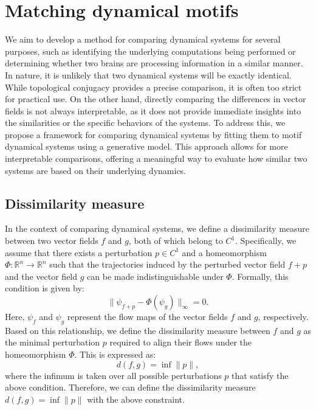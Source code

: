 \documentclass{article}
\theoremstyle{definition} \newtheorem{definition}{Definition}  \newtheorem{example}{Example}
\theoremstyle{remark} \newtheorem{remark}{Remark}
\newcounter{ct}
\begin{document}
\section{Matching dynamical motifs}We aim to develop a method for comparing dynamical systems for several purposes, such as identifying the underlying computations being performed or determining whether two brains are processing information in a similar manner. In nature, it is unlikely that two dynamical systems will be exactly identical.
 While topological conjugacy provides a precise comparison, it is often too strict for practical use.
 On the other hand, directly comparing the differences in vector fields is not always interpretable, as it does not provide immediate insights into the similarities or the specific behaviors of the systems.
  To address this, we propose a framework for comparing dynamical systems by fitting them to motif dynamical systems using a generative model. This approach allows for more interpretable comparisons, offering a meaningful way to evaluate how similar two systems are based on their underlying dynamics.



\subsection{Dissimilarity measure}
In the context of comparing dynamical systems, we define a dissimilarity measure between two vector fields \( f \) and \( g \), both of which belong to \( C^1 \). Specifically, we assume that there exists a perturbation \( p \in C^1 \) and a homeomorphism \( \Phi: \mathbb{R}^n \rightarrow \mathbb{R}^n \) such that the trajectories induced by the perturbed vector field \( f + p \) and the vector field \( g \) can be made indistinguishable under \( \Phi \). Formally, this condition is given by:
\begin{equation}\label{eq:}
\|\psi_{f+p} - \Phi(\psi_{g})\|_\infty = 0.
\end{equation}
Here, \( \psi_{f} \) and \( \psi_{g} \) represent the flow maps of the vector fields \( f \) and \( g \), respectively. Based on this relationship, we define the dissimilarity measure between \( f \) and \( g \) as the minimal perturbation \( p \) required to align their flows under the homeomorphism \( \Phi \). This is expressed as:
\[
d(f, g) = \inf \|p\|,  %
\]
where the infimum is taken over all possible perturbations \( p \) that satisfy the above condition.
Therefore, we can define the dissimilarity measure $d(f,g) = \inf \|p\|$ with the above constraint.
\end{document}
